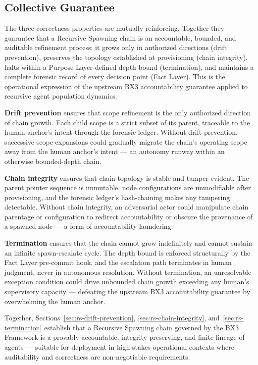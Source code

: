 \subsection{Collective Guarantee}
\label{sec:rs-collective-guarantee}

The three correctness properties are mutually reinforcing. Together they guarantee that a Recursive Spawning chain is an accountable, bounded, and auditable refinement process: it grows only in authorized directions (drift prevention), preserves the topology established at provisioning (chain integrity), halts within a Purpose Layer-defined depth bound (termination), and maintains a complete forensic record of every decision point (Fact Layer). This is the operational expression of the upstream BX3 accountability guarantee applied to recursive agent population dynamics.

\medskip
\textbf{Drift prevention} ensures that scope refinement is the only authorized direction of chain growth. Each child scope is a strict subset of its parent, traceable to the human anchor's intent through the forensic ledger. Without drift prevention, successive scope expansions could gradually migrate the chain's operating scope away from the human anchor's intent --- an autonomy runway within an otherwise bounded-depth chain.

\medskip
\textbf{Chain integrity} ensures that chain topology is stable and tamper-evident. The parent pointer sequence is immutable, node configurations are unmodifiable after provisioning, and the forensic ledger's hash-chaining makes any tampering detectable. Without chain integrity, an adversarial actor could manipulate chain parentage or configuration to redirect accountability or obscure the provenance of a spawned node --- a form of accountability laundering.

\medskip
\textbf{Termination} ensures that the chain cannot grow indefinitely and cannot sustain an infinite spawn-escalate cycle. The depth bound is enforced structurally by the Fact Layer pre-commit hook, and the escalation path terminates in human judgment, never in autonomous resolution. Without termination, an unresolvable exception condition could drive unbounded chain growth exceeding any human's supervisory capacity --- defeating the upstream BX3 accountability guarantee by overwhelming the human anchor.

Together, Sections~\ref{sec:rs-drift-prevention}, \ref{sec:rs-chain-integrity}, and~\ref{sec:rs-termination} establish that a Recursive Spawning chain governed by the BX3 Framework is a provably accountable, integrity-preserving, and finite lineage of agents --- suitable for deployment in high-stakes operational contexts where auditability and correctness are non-negotiable requirements.

